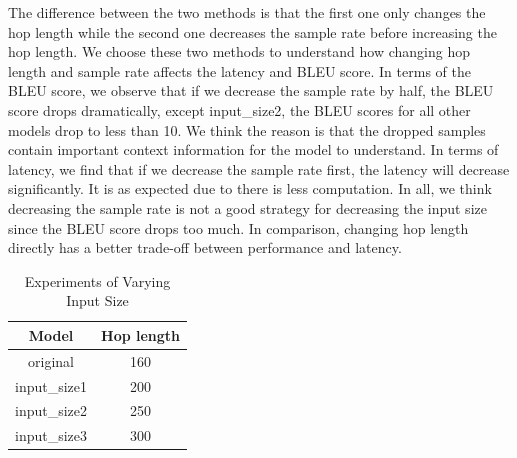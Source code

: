 \documentclass[11pt]{article}
\begin{document}
The difference between the two methods is that the first one only changes the hop length while the second one decreases the sample rate before increasing the hop length. We choose these two methods to understand how changing hop length and sample rate affects the latency and BLEU score. In terms of the BLEU score, we observe that if we decrease the sample rate by half, the BLEU score drops dramatically, except input\_size2, the BLEU scores for all other models drop to less than 10. We think the reason is that the dropped samples contain important context information for the model to understand. In terms of latency, we find that if we decrease the sample rate first, the latency will decrease significantly. It is as expected due to there is less computation. In all, we think decreasing the sample rate is not a good strategy for decreasing the input size since the BLEU score drops too much. In comparison, changing hop length directly has a better trade-off between performance and latency. 

\begin{table}
\centering
\small
\begin{tabular}{cc}
\toprule  
\textbf{Model} & \textbf{Hop length}\\
\midrule 
original & 160\\
input\_size1 & 200\\
input\_size2 & 250\\
input\_size3 & 300\\
\bottomrule
\end{tabular}
\caption{Experiments of Varying Input Size}
\label{tab:vary_input_size}
\end{table}
\end{document}
